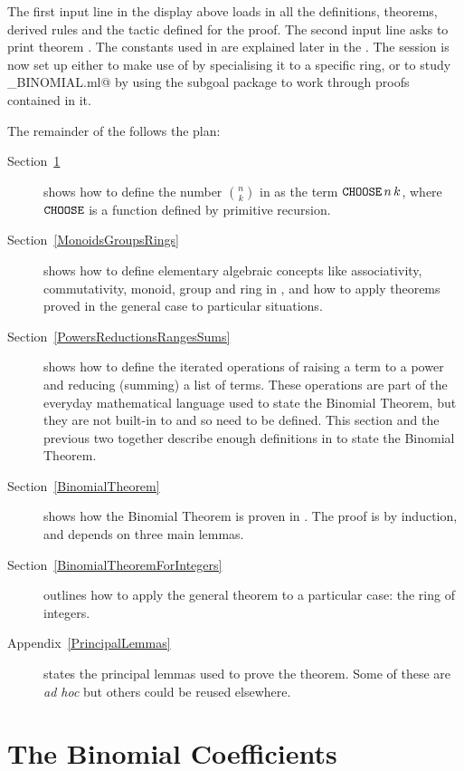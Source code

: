 The first input line in the display above loads in all the definitions,
theorems, derived rules and the tactic defined for the proof.  The second
input line asks \HOL{} to print theorem \verb@BINOMIAL@.  The constants
used in \verb@BINOMIAL@ are explained later in the \self{}.  The \HOL{}
session is now set up either to make use of \verb@BINOMIAL@ by specialising
it to a specific ring, or to study \verb@mk_BINOMIAL.ml@ by using the subgoal
package to work through proofs contained in it.

The remainder of the \self{} follows the plan:
\begin{description}
\item[Section~\ref{BinomialCoefficients}]
    shows how to define the number $n \choose k$ in \HOL{} as the term
    $\mbox{\tt CHOOSE}\,n\,k$, where $\mbox{\tt CHOOSE}$ is a function defined by
    primitive recursion.
\item[Section~\ref{MonoidsGroupsRings}]
    shows how to define elementary algebraic concepts like associativity,
    commutativity, monoid, group and ring in \HOL{}, and how to apply
    theorems proved in the general case to particular situations.
\item[Section~\ref{PowersReductionsRangesSums}]
    shows how to define the iterated operations of raising a term to a
    power and reducing (summing) a list of terms. These operations are
    part of the everyday mathematical language used to state the Binomial
    Theorem, but they are not built-in to \HOL{} and so need to be defined.
    This section and the previous two together describe enough definitions
    in \HOL{} to state the Binomial Theorem.
\item[Section~\ref{BinomialTheorem}]
    shows how the Binomial Theorem is proven in \HOL{}.
    The proof is by induction, and depends on three main lemmas.
\item[Section~\ref{BinomialTheoremForIntegers}]
    outlines how to apply the general theorem to a particular case:
    the ring of integers.
\item[Appendix~\ref{PrincipalLemmas}]
    states the principal lemmas used to prove the theorem.
    Some of these are {\em ad hoc} but others could be reused elsewhere.
\end{description}


\section{The Binomial Coefficients}
\label{BinomialCoefficients}

